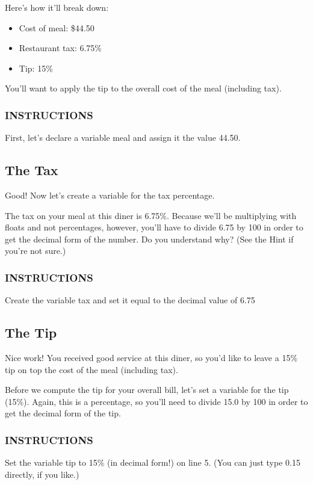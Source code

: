 \documentclass[12pt,a4paper,final,twoside,onecolumn,titlepage]{book}
\begin{document}
Here's how it'll break down:
\begin{itemize}
\item Cost of meal: \$44.50
\item Restaurant tax: 6.75\%
\item Tip: 15\%
\end{itemize}

You'll want to apply the tip to the overall cost of the meal (including tax).

\subsubsection{INSTRUCTIONS}
First, let's declare a variable meal and assign it the value 44.50.

\subsection{The Tax}
Good! Now let's create a variable for the tax percentage.

The tax on your meal at this diner is 6.75\%. Because we'll be multiplying with floats and not percentages, however, you'll have to divide 6.75 by 100 in order to get the decimal form of the number. Do you understand why? (See the Hint if you're not sure.)

\subsubsection{INSTRUCTIONS}
Create the variable tax and set it equal to the decimal value of 6.75%

\subsection{The Tip}
Nice work! You received good service at this diner, so you'd like to leave a 15\% tip on top the cost of the meal (including tax).

Before we compute the tip for your overall bill, let's set a variable for the tip (15\%). Again, this is a percentage, so you'll need to divide 15.0 by 100 in order to get the decimal form of the tip.

\subsubsection{INSTRUCTIONS}
Set the variable tip to 15\% (in decimal form!) on line 5. (You can just type 0.15 directly, if you like.)
\end{document}
